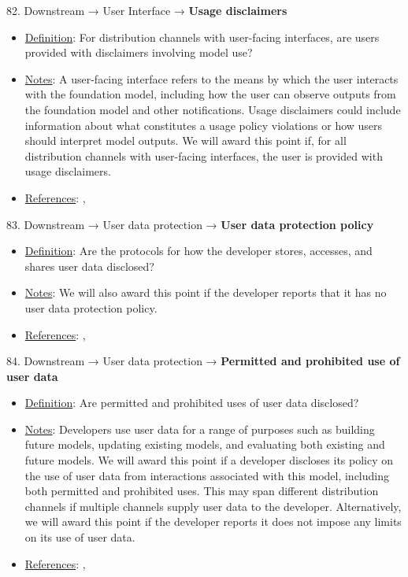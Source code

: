 82. Downstream → User Interface → \textbf{Usage disclaimers}
\vspace{-\parskip}
\begin{itemize}
	\item
	\underline{Definition}: For distribution channels with user-facing interfaces, are users provided with disclaimers involving model use?
	\item
	\underline{Notes}: A user-facing interface refers to the means by which the user interacts with the foundation model, including how the user can observe outputs from the foundation model and other notifications. Usage disclaimers could include information about what constitutes a usage policy violations or how users should interpret model outputs. We will award this point if, for all distribution channels with user-facing interfaces, the user is provided with usage disclaimers.
	\item
	\underline{References}: \citet{qiaosi2023ux}, \citet{nakao2022responsible}
\end{itemize} \vspace{\baselineskip}


83. Downstream → User data protection → \textbf{User data protection policy}
\vspace{-\parskip}
\begin{itemize}
	\item
	\underline{Definition}: Are the protocols for how the developer stores, accesses, and shares user data disclosed?
	\item
	\underline{Notes}: We will also award this point if the developer reports that it has no user data protection policy.
	\item
	\underline{References}: \citet{nissenbaum2004contextual}, \citet{king2020privacy}
\end{itemize} \vspace{\baselineskip}


84. Downstream → User data protection → \textbf{Permitted and prohibited use of user data}
\vspace{-\parskip}
\begin{itemize}
	\item
	\underline{Definition}: Are permitted and prohibited uses of user data disclosed?
	\item
	\underline{Notes}: Developers use user data for a range of purposes such as building future models, updating existing models, and evaluating both existing and future models. We will award this point if a developer discloses its policy on the use of user data from interactions associated with this model, including both permitted and prohibited uses. This may span different distribution channels if multiple channels supply user data to the developer. Alternatively, we will award this point if the developer reports it does not impose any limits on its use of user data.
	\item
	\underline{References}: \citet{nissenbaum2004contextual}, \citet{king2020privacy}
\end{itemize} \vspace{\baselineskip}


